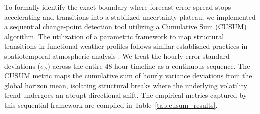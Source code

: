 To formally identify the exact boundary where forecast error spread stops accelerating and transitions into a stabilized uncertainty plateau, we implemented a sequential change-point detection tool utilizing a Cumulative Sum (CUSUM) algorithm. The utilization of a parametric framework to map structural transitions in functional weather profiles follows similar established practices in spatiotemporal atmospheric analysis \citep{wang2022asynchronous}. We treat the hourly error standard deviations ($\sigma_h$) across the entire 48-hour timeline as a continuous sequence. The CUSUM metric maps the cumulative sum of hourly variance deviations from the global horizon mean, isolating structural breaks where the underlying volatility trend undergoes an abrupt directional shift. The empirical metrics captured by this sequential framework are compiled in Table~\ref{tab:cusum_results}.

